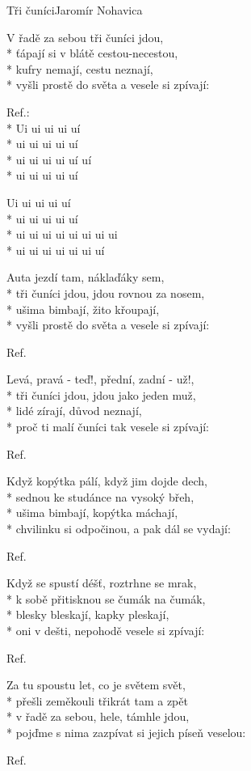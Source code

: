 \documentclass[10.5pt]{book}
\begin{document}
\begin{poem}{Tři čuníci}{Jaromír Nohavica}

\settowidth{\versewidth}{vyšli prostě do světa a vesele si zpívají:}

V řadě za sebou tři čuníci jdou,\\*
ťápají si v blátě cestou-necestou,\\*
kufry nemají, cestu neznají,\\*
vyšli prostě do světa a vesele si zpívají: 

Ref.:\\*
Ui ui ui ui uí\\*
ui ui ui ui uí\\*
ui ui ui ui uí uí\\*
ui ui ui ui uí

Ui ui ui ui uí\\*
ui ui ui ui uí\\*
ui ui ui ui ui ui ui ui\\*
ui ui ui ui ui ui uí

Auta jezdí tam, náklaďáky sem,\\*
tři čuníci jdou, jdou rovnou za nosem,\\*
ušima bimbají, žito křoupají,\\*
vyšli prostě do světa a vesele si zpívají: 

Ref.

Levá, pravá - teď!, přední, zadní - už!,\\*
tři čuníci jdou, jdou jako jeden muž,\\*
lidé zírají, důvod neznají,\\*
proč ti malí čuníci tak vesele si zpívají: 

Ref.

Když kopýtka pálí, když jim dojde dech,\\*
sednou ke studánce na vysoký břeh,\\*
ušima bimbají, kopýtka máchají,\\*
chvilinku si odpočinou, a pak dál se vydají: 

Ref.

Když se spustí déšť, roztrhne se mrak,\\*
k sobě přitisknou se čumák na čumák,\\*
blesky bleskají, kapky pleskají,\\*
oni v dešti, nepohodě vesele si zpívají: 

Ref.

Za tu spoustu let, co je světem svět,\\*
přešli zeměkouli třikrát tam a zpět\\*
v řadě za sebou, hele, támhle jdou,\\*
pojďme s nima zazpívat si jejich píseň veselou: 

Ref.

\end{poem}
\end{document}
